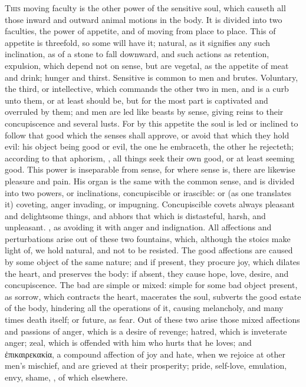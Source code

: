 \lettrine{T}{his} moving faculty is the other power of the sensitive soul,
which causeth all those inward and outward animal motions in the body. It is
divided into two faculties, the power of appetite, and of moving from place to
place. This of appetite is threefold, so some will have it; natural, as it
signifies any such inclination, as of a stone to fall downward, and such
actions as retention, expulsion, which depend not on sense, but are vegetal, as
the appetite of meat and drink; hunger and thirst. Sensitive is common to men
and brutes. Voluntary, the third, or intellective, which commands the other two
in men, and is a curb unto them, or at least should be, but for the most part
is captivated and overruled by them; and men are led like beasts by sense,
giving reins to their concupiscence and several lusts. For by this appetite the
soul is led or inclined to follow that good which the senses shall approve, or
avoid that which they hold evil: his object being good or evil, the one he
embraceth, the other he rejecteth; according to that aphorism, , all things seek their own good, or at least seeming good. This
power is inseparable from sense, for where sense is, there are likewise
pleasure and pain. His organ is the same with the common sense, and is divided
into two powers, or inclinations, concupiscible or irascible: or (as one
translates it) coveting, anger invading, or impugning.
Concupiscible covets always pleasant and delightsome things, and abhors that
which is distasteful, harsh, and unpleasant. , as avoiding it with anger and
indignation. All affections and perturbations arise out of these two fountains,
which, although the stoics make light of, we hold natural, and not to be
resisted. The good affections are caused by some object of the same nature; and
if present, they procure joy, which dilates the heart, and preserves the body:
if absent, they cause hope, love, desire, and concupiscence. The bad are simple
or mixed: simple for some bad object present, as sorrow, which contracts the
heart, macerates the soul, subverts the good estate of the body, hindering all
the operations of it, causing melancholy, and many times death itself; or
future, as fear. Out of these two arise those mixed affections and passions of
anger, which is a desire of revenge; hatred, which is inveterate anger; zeal,
which is offended with him who hurts that he loves; and
\textgreek{ἐπικαιρεκακία}, a compound affection of joy and hate, when we
rejoice at other men's mischief, and are grieved at their prosperity; pride,
self-love, emulation, envy, shame, \etc{}, of which elsewhere.

